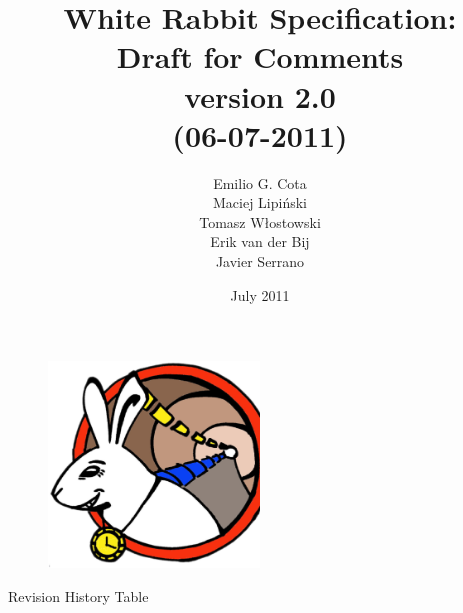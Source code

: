 \documentclass[a4paper, 12pt]{article}
\begin{document}
\title{White Rabbit Specification: \\Draft for Comments\\\normalsize {version 2.0}\\\small{(06-07-2011)}}
\author{Emilio G. Cota\\Maciej Lipi\'{n}ski\\Tomasz W\l{}ostowski\\Erik van der Bij\\Javier Serrano}
\date{July 2011}
\maketitle
\thispagestyle{empty}

\begin{figure}[ht!]
  \centering
  \vspace{1.3cm}
  \includegraphics[width=0.50\textwidth]{logo/WRlogo.ps}
  \label{fig:wr_logo}
\end{figure}




\newpage

\setcounter{page}{1}
\begin{center}
\large Revision History Table 
\end{center} 
\end{document}
